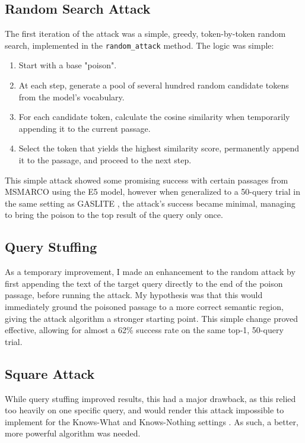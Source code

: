 \documentclass[a4paper, sigconf]{acmart}
\begin{document}
\subsection{Random Search Attack}

The first iteration of the attack was a simple, greedy, token-by-token random search, implemented in the \texttt{random\_attack} method. The logic was simple: 

\begin{enumerate}
  \item Start with a base "poison".
  \item At each step, generate a pool of several hundred random candidate tokens from the model's vocabulary. 
  \item For each candidate token, calculate the cosine similarity when temporarily appending it to the current passage.
  \item Select the token that yields the highest similarity score, permanently append it to the passage, and proceed to the next step.  
\end{enumerate}

This simple attack showed some promising success with certain passages from MSMARCO using the E5 model, however when generalized to a 50-query trial in the same setting as GASLITE \cite{bentov2024}, the attack's success became minimal, managing to bring the poison to the top result of the query only once.

\subsection{Query Stuffing}

As a temporary improvement, I made an enhancement to the random attack by first appending the text of the target query directly to the end of the poison passage, before running the attack. My hypothesis was that this would immediately ground the poisoned passage to a more correct semantic region, giving the attack algorithm a stronger starting point. This simple change proved effective, allowing for almost a 62\% success rate on the same top-1, 50-query trial. 

\subsection{Square Attack}

While query stuffing improved results, this had a major drawback, as this relied too heavily on one specific query, and would render this attack impossible to implement for the Knows-What and Knows-Nothing settings \cite{bentov2024}. As such, a better, more powerful algorithm was needed. 
\end{document}
